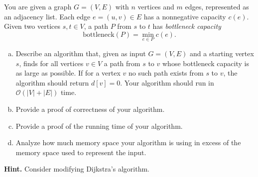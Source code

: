 \documentclass{cs0500}
\begin{document}
\begin{solution}
\end{solution}
\pagebreak
\begin{problem}
You are given a graph $G = (V, E)$ with $n$ vertices and $m$ edges, represented as an adjacency list.
Each edge $e = (u,v) \in E$ has a nonnegative capacity $c(e)$.
Given two vertices $s, t \in V$, a path $P$ from $s$ to $t$ has
\emph{bottleneck capacity}
\[
\text{bottleneck}(P) = \min_{e \in P} c(e).
\]
\begin{enumerate}[(a)]
    \item  Describe an algorithm that, given as input $G=(V,E)$ and a starting vertex $s$, finds for all vertices $v\in V$ a path from $s$ to $v$ whose bottleneck capacity is as large as possible. If for a vertex $v$ no such path exists from $s$ to $v$, the algorithm should return $d[v]=0$. Your algorithm should run in $\mathcal{O}(|V|+|E|)$ time.
\item Provide a proof of correctness of your algorithm.
    \item Provide a proof of the running time of your algorithm.
    \item Analyze how much memory space your algorithm is using in excess of the memory space used to represent the input. 
\end{enumerate}
\medskip
\noindent \textbf{Hint.}
Consider modifying Dijkstra's algorithm.

\end{problem}
\begin{solution}  
\end{solution}
\pagebreak
\end{document}
